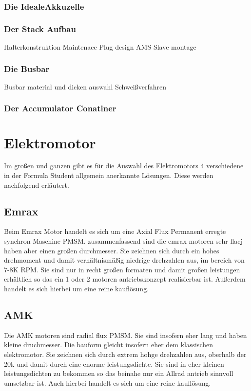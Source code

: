 \subsubsection{Die \glqq Ideale\grqq Akkuzelle}

\subsubsection{Der Stack Aufbau}
Halterkonstruktion
Maintenace Plug design
AMS Slave montage

\subsubsection{Die Busbar}
Busbar material und dicken auswahl
Schweißverfahren


\subsubsection{Der Accumulator Conatiner}

\section{Elektromotor}
Im großen und ganzen gibt es für die Auswahl des Elektromotors 4 verschiedene in der Formula Student allgemein anerkannte Lösungen. Diese werden nachfolgend erläutert.

\subsection{Emrax}
Beim Emrax Motor handelt es sich um eine Axial Flux Permanent erregte synchron Maschine PMSM. zusammenfassend sind die emrax motoren sehr flacj haben aber einen großen durchmesser. Sie zeichnen sich durch ein hohes drehmoment und damit verhältnismäßig niedrige drehzahlen aus, im bereich von 7-8K RPM. Sie sind nur in recht großen formaten und damit großen leistungen erhältlich so das ein 1 oder 2 motoren antriebskonzept realisierbar ist. Außerdem handelt es sich hierbei um eine reine kauflösung. 

\subsection{AMK}
Die AMK motoren sind radial flux PMSM. Sie sind insofern eher lang und haben kleine druchmesser. Die bauform gleicht insofern eher dem klassischen elektromotor. Sie zeichnen sich durch extrem hohge drehzahlen aus, oberhalb der 20k und damit durch eine enorme leistungsdichte. Sie sind in eher kleinen leistungsdichten zu bekommen so das beinahe nur ein Allrad antrieb sinnvoll umsetzbar ist. Auch hierbei handelt es sich um eine reine kauflösung. 


